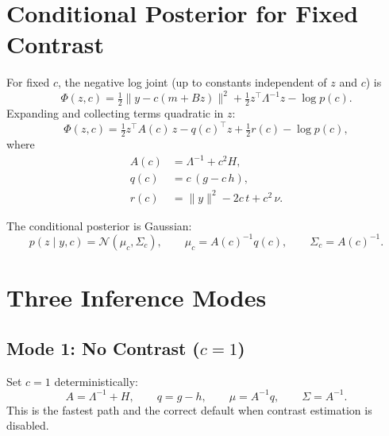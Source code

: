 \documentclass[11pt]{article}
\begin{document}
\section{Conditional Posterior for Fixed Contrast}
\label{sec:fixed-contrast}

For fixed $c$, the negative log joint (up to constants independent of $z$
and $c$) is
\begin{equation}
  \Phi(z, c)
  = \tfrac{1}{2}\|y - c(m + Bz)\|^2 + \tfrac{1}{2} z^\top \Lambda^{-1} z
    - \log p(c).
\end{equation}
Expanding and collecting terms quadratic in $z$:
\begin{equation}
  \Phi(z, c) = \tfrac{1}{2} z^\top A(c)\, z - q(c)^\top z
               + \tfrac{1}{2} r(c) - \log p(c),
\end{equation}
where
\begin{align}
  A(c) &= \Lambda^{-1} + c^2 H, \label{eq:Ac} \\
  q(c) &= c\,(g - c\,h), \label{eq:qc} \\
  r(c) &= \|y\|^2 - 2c\,t + c^2\,\nu. \label{eq:rc}
\end{align}

The conditional posterior is Gaussian:
\begin{equation}
  \label{eq:conditional}
  p(z \mid y, c) = \mathcal{N}(\mu_c, \Sigma_c),
  \qquad
  \mu_c = A(c)^{-1} q(c),
  \qquad
  \Sigma_c = A(c)^{-1}.
\end{equation}

\section{Three Inference Modes}
\label{sec:modes}

\subsection{Mode 1: No Contrast ($c = 1$)}
\label{sec:no-contrast}

Set $c = 1$ deterministically:
\begin{equation}
  A = \Lambda^{-1} + H, \qquad
  q = g - h, \qquad
  \mu = A^{-1} q, \qquad
  \Sigma = A^{-1}.
\end{equation}
This is the fastest path and the correct default when contrast estimation
is disabled.
\end{document}
